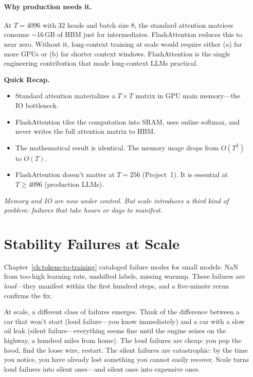 \paragraph{Why production needs it.} At $T = 4096$ with 32 heads and batch size 8, the standard attention matrices consume $\sim$16\,GB of HBM just for intermediates. FlashAttention reduces this to near zero. Without it, long-context training at scale would require either (a) far more GPUs or (b) far shorter context windows. FlashAttention is the single engineering contribution that made long-context LLMs practical.

\begin{quickrecap}
\textbf{Quick Recap.}
\begin{itemize}[nosep,leftmargin=1.5em]
  \item Standard attention materializes a $T \times T$ matrix in GPU main memory---the IO bottleneck.
  \item FlashAttention tiles the computation into SRAM, uses online softmax, and never writes the full attention matrix to HBM.
  \item The mathematical result is identical. The memory usage drops from $O(T^2)$ to $O(T)$.
  \item FlashAttention doesn't matter at $T = 256$ (Project~1). It is essential at $T \geq 4096$ (production LLMs).
\end{itemize}
\textit{Memory and IO are now under control. But scale introduces a third kind of problem: failures that take hours or days to manifest.}
\end{quickrecap}


\section{Stability Failures at Scale}
\label{sec:scale-stability}

Chapter~\ref{ch:tokens-to-training} cataloged failure modes for small models: NaN from too-high learning rate, unshifted labels, missing warmup. These failures are \emph{loud}---they manifest within the first hundred steps, and a five-minute rerun confirms the fix.

At scale, a different class of failures emerges. Think of the difference between a car that won't start (loud failure---you know immediately) and a car with a slow oil leak (silent failure---everything seems fine until the engine seizes on the highway, a hundred miles from home). The loud failures are cheap: you pop the hood, find the loose wire, restart. The silent failures are catastrophic: by the time you notice, you have already lost something you cannot easily recover. Scale turns loud failures into silent ones---and silent ones into expensive ones.

